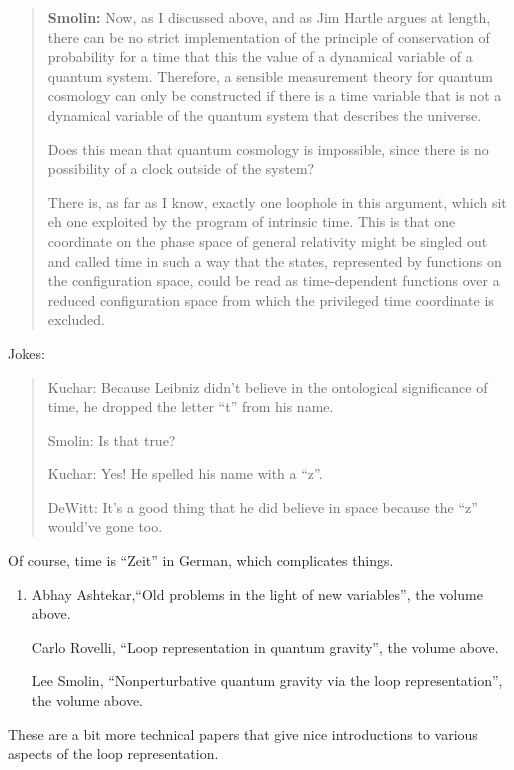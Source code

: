 \documentclass[12pt]{article}
\begin{document}
\begin{quote}
\textbf{Smolin:} Now, as I discussed above, and as Jim Hartle argues at
length, there can be no strict implementation of the principle of
conservation of probability for a time that this the value of a
dynamical variable of a quantum system. Therefore, a sensible
measurement theory for quantum cosmology can only be constructed if
there is a time variable that is not a dynamical variable of the quantum
system that describes the universe.

Does this mean that quantum cosmology is impossible, since there is no
possibility of a clock outside of the system?

There is, as far as I know, exactly one loophole in this argument, which
sit eh one exploited by the program of intrinsic time. This is that one
coordinate on the phase space of general relativity might be singled out
and called time in such a way that the states, represented by functions
on the configuration space, could be read as time-dependent functions
over a reduced configuration space from which the privileged time
coordinate is excluded.
\end{quote}

\noindent Jokes:

\begin{quote}
Kuchar: Because Leibniz didn't believe in the ontological significance
of time, he dropped the letter ``t'' from his name.

Smolin: Is that true?

Kuchar: Yes! He spelled his name with a ``z''.

DeWitt: It's a good thing that he did believe in space because the ``z''
would've gone too.
\end{quote}
Of course, time is ``Zeit'' in German, which complicates things. 

\begin{enumerate}
\def\labelenumi{\arabic{enumi})}
\setcounter{enumi}{3}
\item
  Abhay Ashtekar,``Old problems in the light of new variables'', the
  volume above.

  Carlo Rovelli, ``Loop representation in quantum gravity'', the
  volume above.

  Lee Smolin, ``Nonperturbative quantum gravity via the loop representation'',  the volume above.
\end{enumerate}

\noindent
These are a bit more technical papers that give nice introductions to
various aspects of the loop representation.
\end{document}
